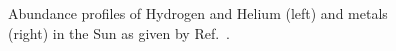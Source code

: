 \documentclass[12pt]{article}
\begin{document}
\begin{figure}[H]
    \centering
    \caption{Abundance profiles of Hydrogen and Helium (left) and metals (right) in the Sun as given by Ref.~\cite{Bahcall_2005}.}
    \label{fig:SSM_abundances}
\end{figure}
\end{document}
